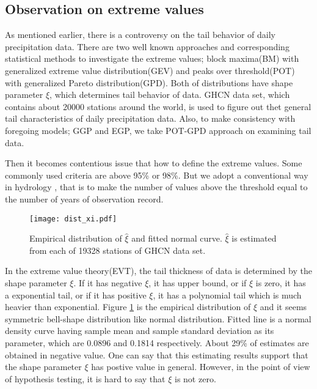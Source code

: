 \documentclass[12pt]{article}\usepackage[]{graphicx}\usepackage[]{color}
\begin{document}

  \subsection{Observation on extreme values}


As mentioned earlier, there is a controversy on the tail behavior of daily precipitation data. There are two well known approaches and corresponding statistical methods to investigate the extreme values; block maxima(BM) with generalized extreme value distribution(GEV) and peaks over threshold(POT) with generalized Pareto distribution(GPD). Both of distributions have shape parameter $\xi$, which determines tail behavior of data. GHCN data set, which contains about 20000 stations around the world, is used to figure out thet general tail characteristics of daily precipitation data. Also, to make consistency with foregoing models; GGP and EGP, we take POT-GPD approach on examining tail data. 

Then it becomes contentious issue that how to define the extreme values. Some commonly used criteria are above 95\% or 98\%. But we adopt a conventional way in hydrology \cite{cunnane1973particular}, that is to make the number of values above the threshold equal to the number of years of observation record. 


\begin{figure}
  \label{fig:empirical_xi}
  \centering
  \texttt{[image: dist\_xi.pdf]}
  \caption{Empirical distribution of $\hat{\xi}$ and fitted normal curve. $\hat{\xi}$ is estimated from each of 19328 stations of GHCN data set.}
\end{figure}


In the extreme value theory(EVT), the tail thickness of data is determined by the shape parameter $\xi$. If it has negative $\xi$, it has upper bound, or if $\xi$ is zero, it has a exponential tail, or if it has positive $\xi$, it has a polynomial tail which is much heavier than exponential. Figure \ref{fig:empirical_xi} is the empirical distribution of $\hat{\xi}$ and it seems symmetric bell-shape distribution like normal distribution. Fitted line is a normal density curve having sample mean and sample standard deviation as its parameter, which are 0.0896 and 0.1814 respectively. About 29\% of estimates are obtained in negative value. One can say that this estimating results support that the shape parameter $\xi$ has postive value in general. However, in the point of view of hypothesis testing, it is hard to say that $\xi$ is not zero. 
\end{document}
